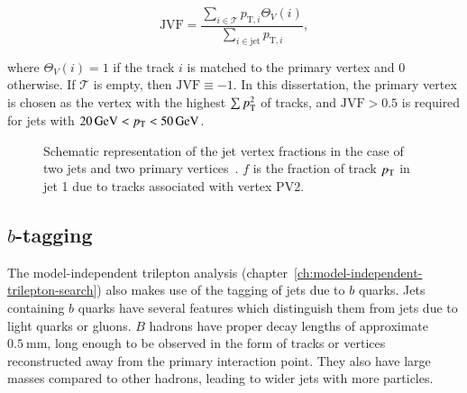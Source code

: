 \begin{equation}\label{eqn:jvf}
	\mathrm{JVF}=\frac{\sum_{i\in\mathcal{T}} p_{\mathrm{T},i} \Theta_V(i)} {\sum_{i\in\mathrm{jet}} p_{\mathrm{T},i} },
\end{equation}

where $\Theta_V(i)=1$ if the track $i$ is matched to the primary vertex and $0$ otherwise. If $\mathcal{T}$ is empty, then $\mathrm{JVF}\equiv -1$. In this dissertation, the primary vertex is chosen as the vertex with the highest $\sum p_{\text{T}}^2$ of tracks, and $\mathrm{JVF}>0.5$ is required for jets with $\SI{20}{\giga\electronvolt}<p_{\text{T}}<\SI{50}{\giga\electronvolt}$. 

\begin{figure}[htbp]
	\centering
	\caption[Schematic representation of the jet vertex fractions in the case of two jets and two primary vertices. $f$ is the fraction of track $\pt$ in jet 1 due to tracks associated with vertex PV2.]{Schematic representation of the jet vertex fractions in the case of two jets and two primary vertices~\cite{TheATLASCollaboration:2013vb}. $f$ is the fraction of track $\pt$ in jet 1 due to tracks associated with vertex PV2.}
	\label{fig:jvf-cartoon}
\end{figure}


\subsection{$b$-tagging}\label{sec:reco-bjets}
The model-independent trilepton analysis (chapter~\ref{ch:model-independent-trilepton-search}) also makes use of the tagging of jets due to $b$ quarks. Jets containing $b$ quarks have several features which distinguish them from jets due to light quarks or gluons. $B$ hadrons have proper decay lengths of approximate $\SI{0.5}{\milli\meter}$, long enough to be observed in the form of tracks or vertices reconstructed away from the primary interaction point. They also have large masses compared to other hadrons, leading to wider jets with more particles. 

